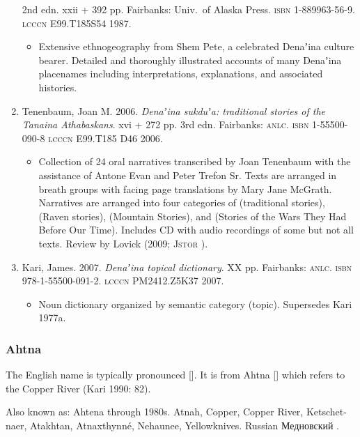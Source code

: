 \documentclass[12pt,letterpaper,oneside,article]{memoir}
\begin{document}
\begin{enumerate}
	2nd edn.
	xxii + 392 pp.
	Fairbanks: Univ.\ of Alaska Press.
	\textsc{isbn} 1-889963-56-9.
	\textsc{lcccn} E99.T185S54 1987.
	\begin{itemize}
	\item	Extensive ethnogeography from Shem Pete, a celebrated Denaʼina culture
		bearer.
		Detailed and thoroughly illustrated accounts of many Denaʼina placenames
		including interpretations, explanations, and associated histories.	
	\end{itemize}
\item	Tenenbaum, Joan M.
	2006.
	\textit{Denaʼina sukduʼa: traditional stories of the Tanaina Athabaskans}.
	xvi + 272 pp.
	3rd edn.
	Fairbanks: \textsc{anlc}.
	\textsc{isbn} 1-55500-090-8
	\textsc{lcccn} E99.T185 D46 2006.
	\begin{itemize}
	\item	Collection of 24 oral narratives transcribed by Joan Tenenbaum with the
		assistance of Antone Evan and Peter Trefon Sr.
		Texts are arranged in breath groups with facing page translations by
		Mary Jane McGrath.
		Narratives are arranged into four categories of  (traditional
		stories),  (Raven stories), 
		(Mountain Stories), and 
		(Stories of the Wars They Had Before Our Time).
		Includes CD with audio recordings of some but not all texts.
		Review by Lovick (2009; \textsc{Jstor} ).
	\end{itemize}
\item	Kari, James.
	2007.
	\textit{Denaʼina topical dictionary}.
	XX pp.
	Fairbanks: \textsc{anlc}.
	\textsc{isbn} 978-1-55500-091-2.
	\textsc{lcccn} PM2412.Z5K37 2007.
	\begin{itemize}
	\item	Noun dictionary organized by semantic category (topic).
		Supersedes Kari 1977a.
	\end{itemize}
\end{enumerate}

\subsubsection{Ahtna}\label{sec:ahtna}

The English name  is typically pronounced []. It is from Ahtna  [] which refers to the Copper River (Kari 1990: 82).

Also known as: Ahtena through 1980s.
Atnah, Copper, Copper River, Ketschet-naer, Atakhtan, Atnaxthynné, Nehaunee, Yellowknives.
Russian Медновский .
\end{document}

